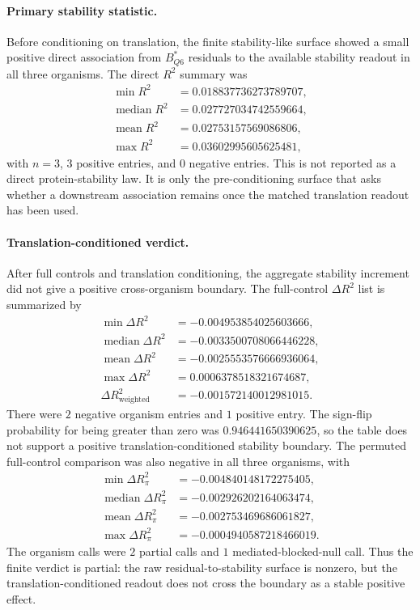 \paragraph{Primary stability statistic.}
Before conditioning on translation, the finite stability-like surface showed a small positive direct association from $B^*_{Q6}$ residuals to the available stability readout in all three organisms.  The direct $R^2$ summary was
$$
\begin{aligned}
\min R^2 &= 0.018837736273789707,\\
\operatorname{median} R^2 &= 0.027727034742559664,\\
\operatorname{mean} R^2 &= 0.02753157569086806,\\
\max R^2 &= 0.03602995605625481,
\end{aligned}
$$
with $n=3$, $3$ positive entries, and $0$ negative entries.  This is not reported as a direct protein-stability law.  It is only the pre-conditioning surface that asks whether a downstream association remains once the matched translation readout has been used.

\paragraph{Translation-conditioned verdict.}
After full controls and translation conditioning, the aggregate stability increment did not give a positive cross-organism boundary.  The full-control $\Delta R^2$ list is summarized by
$$
\begin{aligned}
\min \Delta R^2 &= -0.004953854025603666,\\
\operatorname{median} \Delta R^2 &= -0.0033500708066446228,\\
\operatorname{mean} \Delta R^2 &= -0.0025553576666936064,\\
\max \Delta R^2 &= 0.0006378518321674687,\\
\Delta R^2_{\mathrm{weighted}} &= -0.001572140012981015.
\end{aligned}
$$
There were $2$ negative organism entries and $1$ positive entry.  The sign-flip probability for being greater than zero was $0.946441650390625$, so the table does not support a positive translation-conditioned stability boundary.  The permuted full-control comparison was also negative in all three organisms, with
$$
\begin{aligned}
\min \Delta R^2_{\pi} &= -0.004840148172275405,\\
\operatorname{median} \Delta R^2_{\pi} &= -0.002926202164063474,\\
\operatorname{mean} \Delta R^2_{\pi} &= -0.002753469686061827,\\
\max \Delta R^2_{\pi} &= -0.0004940587218466019.
\end{aligned}
$$
The organism calls were $2$ partial calls and $1$ mediated-blocked-null call.  Thus the finite verdict is partial: the raw residual-to-stability surface is nonzero, but the translation-conditioned readout does not cross the boundary as a stable positive effect.


